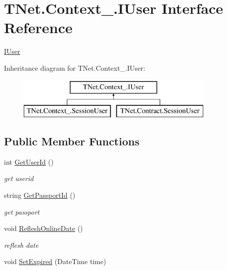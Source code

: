 \hypertarget{interface_t_net_1_1_context___1_1_i_user}{}\section{T\+Net.\+Context\+\_\+.\+I\+User Interface Reference}
\label{interface_t_net_1_1_context___1_1_i_user}


\mbox{\hyperlink{interface_t_net_1_1_context___1_1_i_user}{I\+User}}  


Inheritance diagram for T\+Net.\+Context\+\_\+.\+I\+User\+:\begin{figure}[H]
\begin{center}
\leavevmode
\includegraphics[height=2.000000cm]{interface_t_net_1_1_context___1_1_i_user}
\end{center}
\end{figure}
\subsection*{Public Member Functions}
\begin{DoxyCompactItemize}
\item 
int \mbox{\hyperlink{interface_t_net_1_1_context___1_1_i_user_a92f3fbefd7171a20797ea2115c1d3381}{Get\+User\+Id}} ()
\begin{DoxyCompactList}\small\item\em get userid \end{DoxyCompactList}\item 
string \mbox{\hyperlink{interface_t_net_1_1_context___1_1_i_user_a5c994a142a4d5981d7de87f5cd93d134}{Get\+Passport\+Id}} ()
\begin{DoxyCompactList}\small\item\em get passport \end{DoxyCompactList}\item 
void \mbox{\hyperlink{interface_t_net_1_1_context___1_1_i_user_a7a87e43918c1415f2782cf201fb8228e}{Reflesh\+Online\+Date}} ()
\begin{DoxyCompactList}\small\item\em reflesh date \end{DoxyCompactList}\item 
void \mbox{\hyperlink{interface_t_net_1_1_context___1_1_i_user_a17456df46fa86d2e5626d66493ba8d67}{Set\+Expired}} (Date\+Time time)
\end{DoxyCompactItemize}
